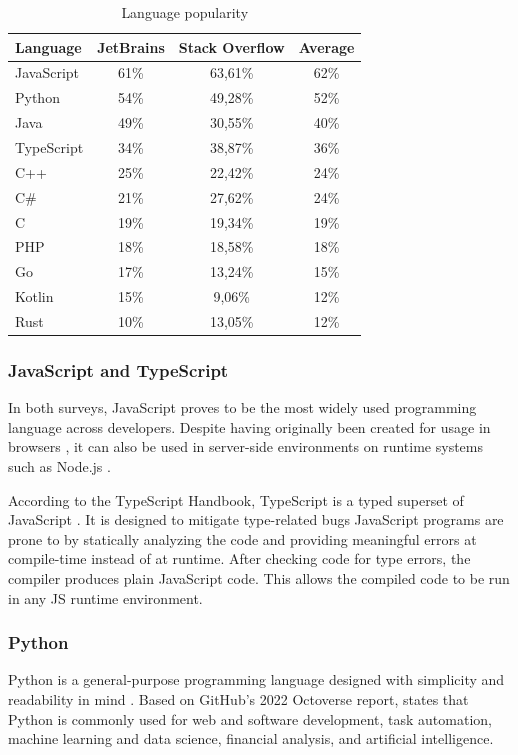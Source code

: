 \begin{table}[H]
\centering
\begin{tabular}{| l| c c c |}
\hline
Language   & JetBrains & Stack Overflow & Average \\
\hline
JavaScript & 61\%      & 63,61\%        & 62\%    \\
Python     & 54\%      & 49,28\%        & 52\%    \\
Java       & 49\%      & 30,55\%        & 40\%    \\
TypeScript & 34\%      & 38,87\%        & 36\%    \\
C++        & 25\%      & 22,42\%        & 24\%    \\
C\#        & 21\%      & 27,62\%        & 24\%    \\
C          & 19\%      & 19,34\%        & 19\%    \\
PHP        & 18\%      & 18,58\%        & 18\%    \\
Go         & 17\%      & 13,24\%        & 15\%    \\
Kotlin     & 15\%      & 9,06\%         & 12\%    \\
Rust       & 10\%      & 13,05\%        & 12\%    \\
\hline
\end{tabular}
\caption{\label{tab:language-popularity}Language popularity}
\end{table}


\subsubsection{JavaScript and TypeScript}
In both surveys, JavaScript proves to be the most widely used programming language across developers. Despite having originally been created for usage in browsers \autocite{NCC1995}, it can also be used in server-side environments on runtime systems such as Node.js \autocite{OpenJSFoundation}.

According to the TypeScript Handbook, TypeScript is a typed superset of JavaScript \autocite{TypeScript2023}. It is designed to mitigate type-related bugs JavaScript programs are prone to by statically analyzing the code and providing meaningful errors at compile-time instead of at runtime. After checking code for type errors, the compiler produces plain JavaScript code. This allows the compiled code to be run in any JS runtime environment.

\subsubsection{Python}
Python is a general-purpose programming language designed with simplicity and readability in mind \autocite{Peters2004}. Based on GitHub's 2022 Octoverse report, \textcite{Scarlett2023} states that Python is commonly used for web and software development, task automation, machine learning and data science, financial analysis, and artificial intelligence.

